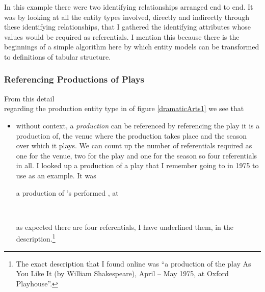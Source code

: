 \begin{notebox}
In this example there were two identifying relationships arranged end to end. It was by looking at all the entity types involved, directly and indirectly through these identifying relationships,
 that I gathered the identifying attributes whose values would be required as referentials. 
I mention this because there is the beginnings of a simple algorithm here by which entity models can be transformed to definitions of tabular structure.
\end{notebox}

\subsubsection{Referencing Productions of Plays}
From this detail 
\begin{equation*}

\end{equation*}
regarding the production entity type in  of figure \ref{dramaticArts1} we see that
\begin{itemize}
  \item
  without context, a \textit{production} can be referenced by referencing the play it is a production of, 
  the venue where the production takes place and the season 
  over which it plays. 
  We can count up the number of referentials required
  as one for the venue, two for the play and one for the season so four referentials in all. 
  I looked up a production of a play that I remember going to in 1975
  to use as an example. 
  It was
\begin{erquote}
\parbox{9cm}{a production of \mbox{'s} 
 performed \mbox{,} at }\\
\end{erquote}
as expected there are four referentials, I have underlined them, in the description.\footnote{
The exact description that I found online was ``a production of the play As You Like It (by William Shakespeare), April – May 1975, at Oxford Playhouse''.  
} 
\end{itemize}

